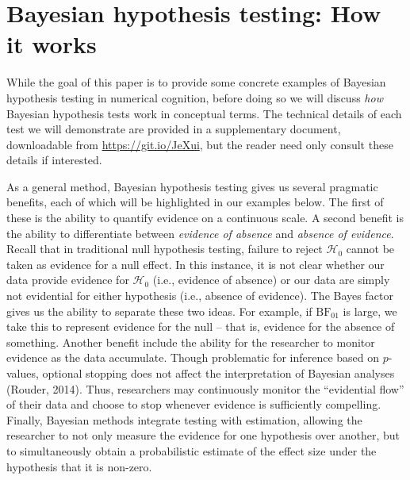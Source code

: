 \documentclass[english,,doc,floatsintext]{apa6}
\begin{document}
\hypertarget{bayesian-hypothesis-testing-how-it-works}{%
\section{Bayesian hypothesis testing: How it works}\label{bayesian-hypothesis-testing-how-it-works}}

While the goal of this paper is to provide some concrete examples of Bayesian hypothesis testing in numerical cognition, before doing so we will discuss \emph{how} Bayesian hypothesis tests work in conceptual terms. The technical details of each test we will demonstrate are provided in a supplementary document, downloadable from \url{https://git.io/JeXui}, but the reader need only consult these details if interested.

As a general method, Bayesian hypothesis testing gives us several pragmatic benefits, each of which will be highlighted in our examples below. The first of these is the ability to quantify evidence on a continuous scale. A second benefit is the ability to differentiate between \emph{evidence of absence} and \emph{absence of evidence}. Recall that in traditional null hypothesis testing, failure to reject \(\mathcal{H}_0\) cannot be taken as evidence for a null effect. In this instance, it is not clear whether our data provide evidence for \(\mathcal{H}_0\) (i.e., evidence of absence) or our data are simply not evidential for either hypothesis (i.e., absence of evidence). The Bayes factor gives us the ability to separate these two ideas. For example, if \(\text{BF}_{01}\) is large, we take this to represent evidence for the null -- that is, evidence for the absence of something. Another benefit include the ability for the researcher to monitor evidence as the data accumulate. Though problematic for inference based on \(p\)-values, optional stopping does not affect the interpretation of Bayesian analyses (Rouder, 2014). Thus, researchers may continuously monitor the \enquote{evidential flow} of their data and choose to stop whenever evidence is sufficiently compelling. Finally, Bayesian methods integrate testing with estimation, allowing the researcher to not only measure the evidence for one hypothesis over another, but to simultaneously obtain a probabilistic estimate of the effect size under the hypothesis that it is non-zero.
\end{document}
